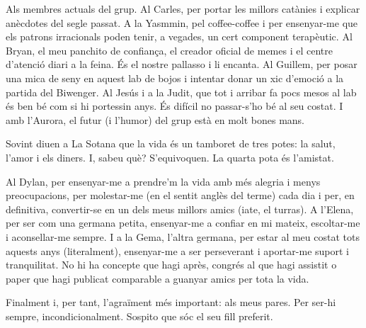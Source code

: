 Als membres actuals del grup. Al Carles, per portar les millors catànies i explicar anècdotes del segle passat. A la Yasmmin, pel coffee-coffee i per ensenyar-me que els patrons irracionals poden tenir, a vegades, un cert component terapèutic. Al Bryan, el meu panchito de confiança, el creador oficial de memes i el centre d’atenció diari a la feina. És el nostre pallasso i li encanta. Al Guillem, per posar una mica de seny en aquest lab de bojos i intentar donar un xic d’emoció a la partida del Biwenger. Al Jesús i a la Judit, que tot i arribar fa pocs mesos al lab és ben bé com si hi portessin anys. És difícil no passar-s’ho bé al seu costat. I amb l’Aurora, el futur (i l’humor) del grup està en molt bones mans.

Sovint diuen a La Sotana que la vida és un tamboret de tres potes: la salut, l’amor i els diners. I, sabeu què? S’equivoquen. La quarta pota és l’amistat. 

Al Dylan, per ensenyar-me a prendre’m la vida amb més alegria i menys preocupacions, per molestar-me (en el sentit anglès del terme) cada dia i per, en definitiva, convertir-se en un dels meus millors amics (iate, el turras). A l’Elena, per ser com una germana petita, ensenyar-me a confiar en mi mateix, escoltar-me i aconsellar-me sempre. I a la Gema, l’altra germana, per estar al meu costat tots aquests anys (literalment), ensenyar-me a ser perseverant i aportar-me suport i tranquilitat. No hi ha concepte que hagi après, congrés al que hagi assistit o paper que hagi publicat comparable a guanyar amics per tota la vida. 

Finalment i, per tant, l’agraïment més important: als meus pares. Per ser-hi sempre, incondicionalment. Sospito que sóc el seu fill preferit.

 